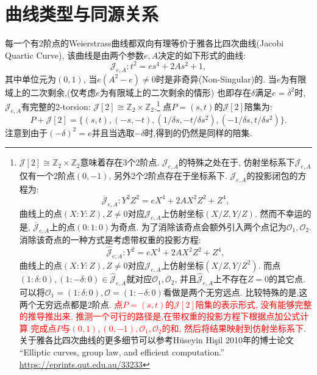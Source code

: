 \documentclass{article}
\newcommand{\Z}{\mathbb{Z}}
\newcommand{\J}{\mathcal{J}}
\newcommand{\red}{\textcolor{red}}
\begin{document}
\section{曲线类型与同源关系}

每一个有2阶点的Weierstrass曲线都双向有理等价于雅各比四次曲线(Jacobi Quartic Curve),
该曲线是由两个参数$e, A$决定的如下形式的曲线:
$$
\J_{e, A}: t^2 = es^4 + 2As^2 + 1,
$$
其中单位元为$(0,1)$, 当$e(A^2-e) \neq 0$时是非奇异(Non-Singular)的.
当$e$为有限域上的二次剩余,(仅考虑$e$为有限域上的二次剩余的情形) 
也即存在$\delta$满足$e = \delta^2$时, 
$\J_{e, A}$有完整的2-torsion: $\J[2] \cong \Z_2 \times \Z_2$.\footnote{
$\J[2] \cong \Z_2 \times \Z_2$意味着存在3个2阶点. $\J_{e, A}$的特殊之处在于,
仿射坐标系下$\J_{e,A}$仅有一个2阶点$(0,-1)$, 另外2个2阶点存在于坐标系下.
$\J_{e, A}$的投影闭包的方程为:
$$
\overline{\J}_{e,A}: Y^2Z^2 = eX^4 + 2AX^2Z^2 + Z^4,
$$
曲线上的点$(X : Y : Z), Z \neq 0$对应$\J_{e, A}$上仿射坐标$(X/Z,Y/Z)$.
然而不幸运的是, $\overline{\J}_{e,A}$上的点$(0: 1: 0)$为奇点. 
为了消除该奇点会额外引入两个点记为$\mathcal{O}_1, \mathcal{O}_2$.
消除该奇点的一种方式是考虑带权重的投影方程:
$$
\hat{\J}_{e,A} : Y^2 = eX^4 + 2AX^2Z^2 + Z^4,
$$
曲线上的点$(X : Y : Z), Z \neq 0$对应$\J_{e, A}$上仿射坐标$(X/Z,Y/Z^2)$.
而点$(1 : \delta : 0), (1 : -\delta : 0) \in \hat{\J}_{e,A}$就对应$\mathcal{O}_1, \mathcal{O}_2$,
并且$\hat{\J}_{e,A}$上不存在$Z = 0$的其它点. 
可以将$\mathcal{O}_1 = (1 : \delta : 0), \mathcal{O} = (1 : -\delta : 0)$看做是两个无穷远点.
比较特殊的是,这两个无穷远点都是2阶点.
\red{点$P = (s,t)$的$\J[2]$陪集的表示形式, 没有能够完整的推导推出来.
推测一个可行的路径是,在带权重的投影方程下根据点加公式计算
完成点$P$与$(0,1), (0,-1), \mathcal{O}_1, \mathcal{O}_2$的和,
然后将结果映射到仿射坐标系下}.
关于雅各比四次曲线的更多细节可以参考Hüseyin Hişil 2010年的博士论文
``Elliptic curves, group law, and efficient computation.''
\url{https://eprints.qut.edu.au/33233}}
点$P= (s,t)$的$\J[2]$陪集为:
$$
P + \J[2] = \{(s,t), (-s, -t), (1/\delta s, -t/\delta s^2), (-1 / \delta s, t / \delta s^2) \}.
$$
注意到由于$(-\delta)^2 = e$并且当选取$-\delta$时,得到的仍然是同样的陪集.
\end{document}

